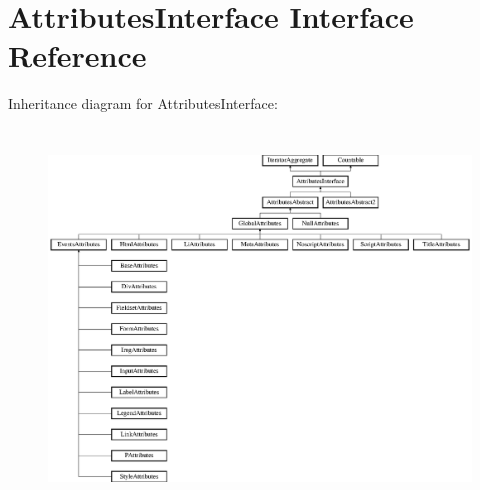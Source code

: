 \hypertarget{interface_pes_1_1_dom_1_1_node_1_1_attributes_1_1_attributes_interface}{}\section{Attributes\+Interface Interface Reference}
\label{interface_pes_1_1_dom_1_1_node_1_1_attributes_1_1_attributes_interface}
Inheritance diagram for Attributes\+Interface\+:\begin{figure}[H]
\begin{center}
\leavevmode
\includegraphics[height=10.078739cm]{interface_pes_1_1_dom_1_1_node_1_1_attributes_1_1_attributes_interface}
\end{center}
\end{figure}
